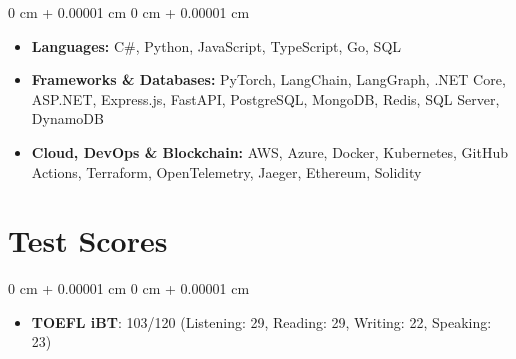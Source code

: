 \documentclass[10pt, letterpaper]{article}
\newenvironment{highlights}{
    \begin{itemize}[
        topsep=0.10 cm,
        parsep=0.10 cm,
        partopsep=0pt,
        itemsep=0pt,
        leftmargin=0 cm + 10pt
    ]
}{
    \end{itemize}
} %
\newenvironment{onecolentry}{
    \begin{adjustwidth}{
        0 cm + 0.00001 cm
    }{
        0 cm + 0.00001 cm
    }
}{
    \end{adjustwidth}
} %
\begin{document}
\begin{onecolentry}
    \begin{highlights}
        \item \textbf{Languages:} C\#, Python, JavaScript, TypeScript, Go, SQL
        \item \textbf{Frameworks \& Databases:} PyTorch, LangChain, LangGraph, .NET Core, ASP.NET, Express.js, FastAPI, PostgreSQL, MongoDB, Redis, SQL Server, DynamoDB
        \item \textbf{Cloud, DevOps \& Blockchain:} AWS, Azure, Docker, Kubernetes, GitHub Actions, Terraform, OpenTelemetry, Jaeger, Ethereum, Solidity
    \end{highlights}
\end{onecolentry}

\section{Test Scores}

\begin{onecolentry}
    \begin{highlights}
        \item \textbf{TOEFL iBT}: 103/120 (Listening: 29, Reading: 29, Writing: 22, Speaking: 23)
    \end{highlights}
\end{onecolentry}
\end{document}

